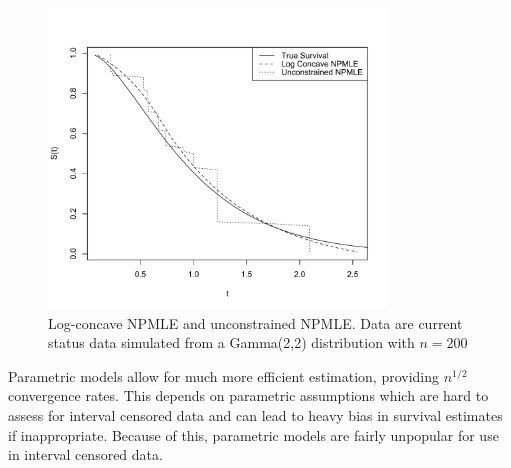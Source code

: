 \documentclass[10pt]{article}
\begin{document}
\begin{figure}[h]
\centerline{\includegraphics[width = 9cm]{LCvUC.pdf} }
\caption[Log-Concave NPMLE and Unconstrained NPMLE]{Log-concave NPMLE and unconstrained NPMLE. Data are current status data simulated from a Gamma(2,2) distribution with $n = 200$ }
\end{figure} 

	
	Parametric models allow for much more efficient estimation, providing $n^{1/2}$ convergence rates. This depends on parametric assumptions which are hard to assess for interval censored data and can lead to heavy bias in survival estimates if inappropriate. Because of this, parametric models are fairly unpopular for use in interval censored data. 	
	
\end{document}
